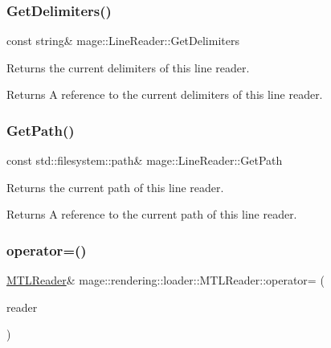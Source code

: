 \subsubsection{\texorpdfstring{Get\+Delimiters()}{GetDelimiters()}}
{\footnotesize\ttfamily const string\& mage\+::\+Line\+Reader\+::\+Get\+Delimiters\hspace{0.3cm}{\ttfamily [noexcept]}}

Returns the current delimiters of this line reader.

\begin{DoxyReturn}{Returns}
A reference to the current delimiters of this line reader. 
\end{DoxyReturn}
\mbox{\label{classmage_1_1rendering_1_1loader_1_1_m_t_l_reader_a9740b3cecdcf5a27c696a08eef3b09da}} 
\subsubsection{\texorpdfstring{Get\+Path()}{GetPath()}}
{\footnotesize\ttfamily const std\+::filesystem\+::path\& mage\+::\+Line\+Reader\+::\+Get\+Path\hspace{0.3cm}{\ttfamily [noexcept]}}

Returns the current path of this line reader.

\begin{DoxyReturn}{Returns}
A reference to the current path of this line reader. 
\end{DoxyReturn}
\mbox{\label{classmage_1_1rendering_1_1loader_1_1_m_t_l_reader_a1153606ce103d9f667726cf5f66a88d1}} 
\subsubsection{\texorpdfstring{operator=()}{operator=()}\hspace{0.1cm}{\footnotesize\ttfamily [1/2]}}
{\footnotesize\ttfamily \mbox{\hyperlink{classmage_1_1rendering_1_1loader_1_1_m_t_l_reader}{M\+T\+L\+Reader}}\& mage\+::rendering\+::loader\+::\+M\+T\+L\+Reader\+::operator= (\begin{DoxyParamCaption}\item[{const \mbox{\hyperlink{classmage_1_1rendering_1_1loader_1_1_m_t_l_reader}{M\+T\+L\+Reader}} \&}]{reader }\end{DoxyParamCaption})\hspace{0.3cm}{\ttfamily [delete]}}

